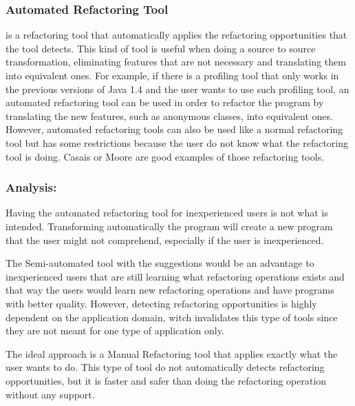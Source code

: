 \subsubsection{Automated Refactoring Tool}
is a refactoring tool that automatically applies the refactoring opportunities that the tool detects.
This kind of tool is useful when doing a source to source transformation, eliminating features that are not necessary and translating them into equivalent ones.
For example, if there is a profiling tool that only works in the previous versions of Java 1.4 and the user wants to use such profiling tool, an automated refactoring tool can be used in order to refactor the program by translating the new features, such as anonymous classes, into equivalent ones.
However, automated refactoring tools can also be used like a normal refactoring tool but has some restrictions because the user do not know what the refactoring tool is doing.
Casais \cite{casais1994automatic} or Moore \cite{moore1996automatic} are good examples of those refactoring tools.





\subsubsection{Analysis:}
Having the automated refactoring tool for inexperienced users is not what is intended.
Transforming automatically the program will create a new program that the user might not comprehend, especially if the user is inexperienced.

The Semi-automated tool with the suggestions would be an advantage to inexperienced users that are still learning what refactoring operations exists and that way the users would learn new refactoring operations and have programs with better quality.
However, detecting refactoring opportunities is highly dependent on the application domain, witch invalidates this type of tools since they are not meant for one type of application only.

The ideal approach is a Manual Refactoring tool that applies exactly what the user wants to do.
This type of tool do not automatically detects refactoring opportunities, but it is faster and safer than doing the refactoring operation without any support.
